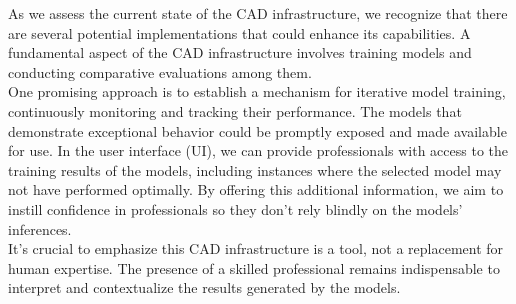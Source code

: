 As we assess the current state of the CAD infrastructure, we recognize that
there are several potential implementations that could enhance its
capabilities. A fundamental aspect of the CAD infrastructure involves training
models and conducting comparative evaluations among them. \\

One promising approach is to establish a mechanism for iterative model
training, continuously monitoring and tracking their performance. The models
that demonstrate exceptional behavior could be promptly exposed and made
available for use. In the user interface (UI), we can provide professionals
with access to the training results of the models, including instances where
the selected model may not have performed optimally. By offering this
additional information, we aim to instill confidence in professionals so they
don't rely blindly on the models' inferences. \\

It's crucial to emphasize this CAD infrastructure is a tool, not a
replacement for human expertise. The presence of a skilled professional remains
indispensable to interpret and contextualize the results generated by the
models.
